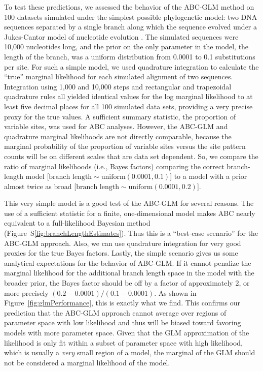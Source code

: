 To test these predictions, we assessed the behavior of the ABC-GLM method on
100 datasets simulated under the simplest possible phylogenetic model: two DNA
sequences separated by a single branch along which the sequence evolved under a
Jukes-Cantor model of nucleotide evolution \citep{JC1969}.
The simulated sequences were 10,000 nucleotides long, and the prior on the only
parameter in the model, the length of the branch, was a uniform distribution
from 0.0001 to 0.1 substitutions per site.
For such a simple model, we used quadrature integration to calculate the
``true'' marginal likelihood for each simulated alignment of two sequences.
Integration using 1,000 and 10,000 steps and rectangular and trapezoidal
quadrature rules all yielded identical values for the log marginal likelihood
to at least five decimal places for all 100 simulated data sets, providing a
very precise proxy for the true values.
A sufficient summary statistic, the proportion of variable sites, was used for
ABC analyses.
However, the ABC-GLM and quadrature marginal likelihoods are not directly
comparable, because the marginal probability of the proportion of variable
sites versus the site pattern counts will be on different scales that are data
set dependent.
So, we compare the ratio of marginal likelihoods (i.e., Bayes factors)
comparing the correct branch-length model
[$\textrm{branch length} \sim \textrm{uniform}(0.0001, 0.1)$]
to a model with a prior almost twice as broad
[$\textrm{branch length} \sim \textrm{uniform}(0.0001, 0.2)$].

This very simple model is a good test of the ABC-GLM for several reasons.
The use of a sufficient statistic for a finite, one-dimensional model makes ABC
nearly equivalent to a full-likelihood Bayesian method
(Figure~S\ref{fig:branchLengthEstimates}).
Thus this is a ``best-case scenario'' for the ABC-GLM approach.
Also, we can use quadrature integration for very good proxies for the true
Bayes factors.
Lastly, the simple scenario gives us some analytical expectations for the
behavior of ABC-GLM.
If it cannot penalize the marginal likelihood for the additional branch length
space in the model with the broader prior, the Bayes factor should be off by a
factor of approximately 2, or more precisely $(0.2-0.0001) / (0.1-0.0001)$.
As shown in Figure~\ref{fig:glmPerformance}, this is exactly what we find.
This confirms our prediction that the ABC-GLM approach cannot average over
regions of parameter space with low likelihood and thus will be biased toward
favoring models with more parameter space.
Given that the GLM approximation of the likelihood is only fit within a subset
of parameter space with high likelihood, which is usually a \emph{very} small
region of a model, the marginal of the GLM should not be considered a marginal
likelihood of the model.

